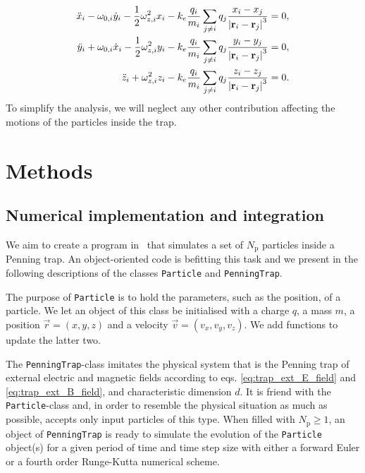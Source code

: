 \begin{subequations}\label{eq:p4_diffeq_many_particles_xyz}
    \begin{align}
        \ddot{x}_i - \omega_{0,i} \dot{y}_i - \frac{1}{2}\omega_{z,i}^2 x_i - k_e \frac{q_i}{m_i} \sum_{j\neq i} q_j \frac{x_i - x_j}{\abs{\mathbf{r}_i - \mathbf{r}_j}^3} =0, \label{eq:p4_diffeq_many_particles_x} \\
        \ddot{y}_i + \omega_{0,i} \dot{x}_i - \frac{1}{2}\omega_{z,i}^2 y_i - k_e \frac{q_i}{m_i} \sum_{j\neq i} q_j \frac{y_i - y_j}{\abs{\mathbf{r}_i - \mathbf{r}_j}^3} =0, \label{eq:p4_diffeq_many_particles_y} \\ 
        \ddot{z}_i + \omega_{z,i}^2 z_i - k_e \frac{q_i}{m_i} \sum_{j\neq i} q_j \frac{z_i - z_j}{\abs{\mathbf{r}_i - \mathbf{r}_j}^3} =0. \label{eq:p4_diffeq_many_particles_z}
    \end{align}
\end{subequations}
To simplify the analysis, we will neglect any other contribution affecting the motions of the particles inside the trap. 

\section{Methods}\label{sec:methods}


\subsection{Numerical implementation and integration}\label{sec:code}

We aim to create a program in \CC\, that simulates a set of $N_\mathrm{p}$ particles inside a Penning trap. An object-oriented code is befitting this task and we present in the following descriptions of the classes \verb|Particle| and \verb|PenningTrap|.

The purpose of \texttt{Particle} is to hold the parameters, such as the position, of a particle. We let an object of this class be initialised with a charge $q$, a mass $m$, a position $\vec{r} = (x,y,z)$ and a velocity $\vec{v} = (v_x, v_y, v_z)$. We add functions to update the latter two. 

The \texttt{PenningTrap}-class imitates the physical system that is the Penning trap of external electric and magnetic fields according to eqs. \eqref{eq:trap_ext_E_field} and \eqref{eq:trap_ext_B_field}, and characteristic dimension $d$. It is friend with the \texttt{Particle}-class and, in order to resemble the physical situation as much as possible, accepts only input particles of this type. When filled with $N_\mathrm{p}\geq 1$, an object of \texttt{PenningTrap} is ready to simulate the evolution of the \texttt{Particle} object(s) for a given period of time and time step size with either a forward Euler or a fourth order Runge-Kutta numerical scheme. 

